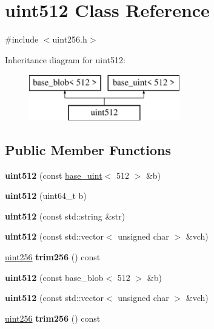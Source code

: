 \hypertarget{classuint512}{}\section{uint512 Class Reference}
\label{classuint512}


{\ttfamily \#include $<$uint256.\+h$>$}

Inheritance diagram for uint512\+:\begin{figure}[H]
\begin{center}
\leavevmode
\includegraphics[height=2.000000cm]{classuint512}
\end{center}
\end{figure}
\subsection*{Public Member Functions}
\begin{DoxyCompactItemize}
\item 
\mbox{\label{classuint512_a7650e39f0ddd7401d6f9edb70cc30715}} 
{\bfseries uint512} (const \mbox{\hyperlink{classbase__uint}{base\+\_\+uint}}$<$ 512 $>$ \&b)
\item 
\mbox{\label{classuint512_a9b0342e991f4a3f858c9744a671b83d2}} 
{\bfseries uint512} (uint64\+\_\+t b)
\item 
\mbox{\label{classuint512_a407d2a7a59005a57e848327014c7d2b5}} 
{\bfseries uint512} (const std\+::string \&str)
\item 
\mbox{\label{classuint512_a017c6e9933a94a0d9b2eb2fff280065a}} 
{\bfseries uint512} (const std\+::vector$<$ unsigned char $>$ \&vch)
\item 
\mbox{\label{classuint512_a90ae45972cae81e4e2d941ebe927b65c}} 
\mbox{\hyperlink{classuint256}{uint256}} {\bfseries trim256} () const
\item 
\mbox{\label{classuint512_a2f7397da9bcf317c37b246f217c47999}} 
{\bfseries uint512} (const base\+\_\+blob$<$ 512 $>$ \&b)
\item 
\mbox{\label{classuint512_a017c6e9933a94a0d9b2eb2fff280065a}} 
{\bfseries uint512} (const std\+::vector$<$ unsigned char $>$ \&vch)
\item 
\mbox{\label{classuint512_a90ae45972cae81e4e2d941ebe927b65c}} 
\mbox{\hyperlink{classuint256}{uint256}} {\bfseries trim256} () const
\end{DoxyCompactItemize}
